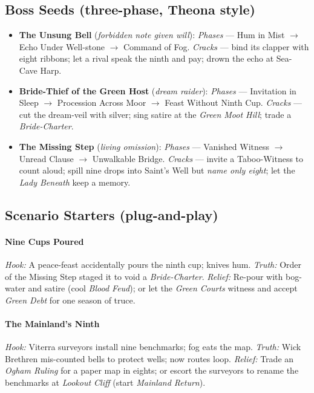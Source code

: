 \subsection*{Boss Seeds (three-phase, Theona style)}
\begin{itemize}
  \item \textbf{The Unsung Bell} (\emph{forbidden note given will}): \emph{Phases} — Hum in Mist $\rightarrow$ Echo Under Well-stone $\rightarrow$ Command of Fog. \emph{Cracks} — bind its clapper with eight ribbons; let a rival speak the ninth and pay; drown the echo at Sea-Cave Harp.
  \item \textbf{Bride-Thief of the Green Host} (\emph{dream raider}): \emph{Phases} — Invitation in Sleep $\rightarrow$ Procession Across Moor $\rightarrow$ Feast Without Ninth Cup. \emph{Cracks} — cut the dream-veil with silver; sing satire at the \emph{Green Moot Hill}; trade a \emph{Bride-Charter}.
  \item \textbf{The Missing Step} (\emph{living omission}): \emph{Phases} — Vanished Witness $\rightarrow$ Unread Clause $\rightarrow$ Unwalkable Bridge. \emph{Cracks} — invite a Taboo-Witness to count aloud; spill nine drops into Saint’s Well but \emph{name only eight}; let the \emph{Lady Beneath} keep a memory.
\end{itemize}

\subsection*{Scenario Starters (plug-and-play)}
\paragraph{Nine Cups Poured}
\emph{Hook:} A peace-feast accidentally pours the ninth cup; knives hum.  
\emph{Truth:} Order of the Missing Step staged it to void a \emph{Bride-Charter}.  
\emph{Relief:} Re-pour with bog-water and satire (cool \emph{Blood Feud}); or let the \emph{Green Courts} witness and accept \emph{Green Debt} for one season of truce.

\paragraph{The Mainland’s Ninth}
\emph{Hook:} Viterra surveyors install nine benchmarks; fog eats the map.  
\emph{Truth:} Wick Brethren mis-counted bells to protect wells; now routes loop.  
\emph{Relief:} Trade an \emph{Ogham Ruling} for a paper map in eights; or escort the surveyors to rename the benchmarks at \emph{Lookout Cliff} (start \emph{Mainland Return}).

